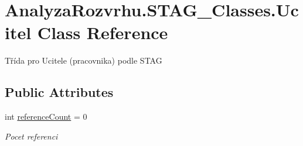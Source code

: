 \hypertarget{class_analyza_rozvrhu_1_1_s_t_a_g___classes_1_1_ucitel}{}\section{Analyza\+Rozvrhu.\+S\+T\+A\+G\+\_\+\+Classes.\+Ucitel Class Reference}
\label{class_analyza_rozvrhu_1_1_s_t_a_g___classes_1_1_ucitel}


Třída pro Ucitele (pracovnika) podle S\+T\+AG  


\subsection*{Public Attributes}
\begin{DoxyCompactItemize}
\item 
int \hyperlink{class_analyza_rozvrhu_1_1_s_t_a_g___classes_1_1_ucitel_a44ca8b9f8a4fd37309d622bb52012012}{reference\+Count} = 0
\begin{DoxyCompactList}\small\item\em Pocet referenci \end{DoxyCompactList}\end{DoxyCompactItemize}
